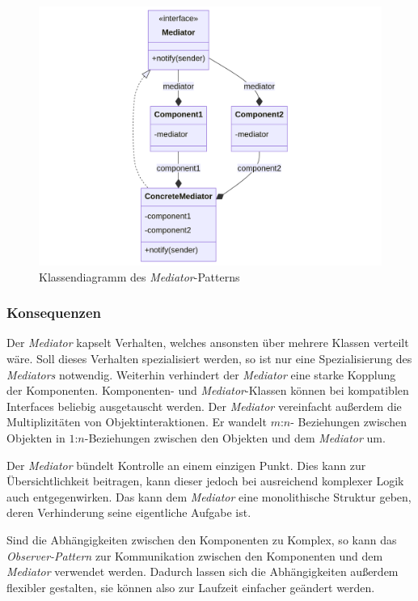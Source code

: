 \begin{figure}[H]
	\centering
	\includegraphics[width=0.75\linewidth]{images/patterns/mediator-class.png}
	\caption{Klassendiagramm des \emph{Mediator}-Patterns \cite{skobeleva_mediator_2023}}
	\label{fig:mediator-class}
\end{figure}

\subsubsection*{Konsequenzen}

Der \emph{Mediator} kapselt Verhalten, welches ansonsten über mehrere Klassen verteilt wäre. Soll dieses Verhalten spezialisiert werden, so ist nur eine Spezialisierung des \emph{Mediators} notwendig. Weiterhin verhindert der \emph{Mediator} eine starke Kopplung der Komponenten. Komponenten- und \emph{Mediator}-Klassen können bei kompatiblen Interfaces beliebig ausgetauscht werden. Der \emph{Mediator} vereinfacht außerdem die Multiplizitäten von Objektinteraktionen. Er wandelt $m$:$n$- Beziehungen zwischen Objekten in $1$:$n$-Beziehungen zwischen den Objekten und dem \emph{Mediator} um.

Der \emph{Mediator} bündelt Kontrolle an einem einzigen Punkt. Dies kann zur Übersichtlichkeit beitragen, kann dieser jedoch bei ausreichend komplexer Logik auch entgegenwirken. Das kann dem \emph{Mediator} eine monolithische Struktur geben, deren Verhinderung seine eigentliche Aufgabe ist.

Sind die Abhängigkeiten zwischen den Komponenten zu Komplex, so kann das \emph{Observer-Pattern} zur Kommunikation zwischen den Komponenten und dem \emph{Mediator} verwendet werden. Dadurch lassen sich die Abhängigkeiten außerdem flexibler gestalten, sie können also zur Laufzeit einfacher geändert werden. \cite{gamma_design_1995}